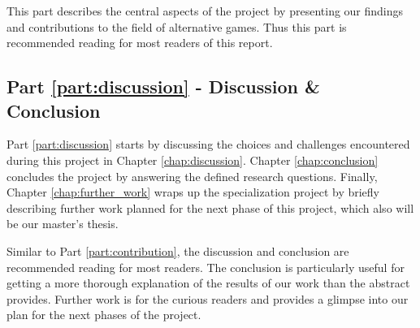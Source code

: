 \documentclass[../Main.tex]{subfiles}
\begin{document}
This part describes the central aspects of the project by presenting our findings and contributions to the field of alternative games. Thus this part is recommended reading for most readers of this report.

\subsection*{Part \ref{part:discussion} - Discussion \& Conclusion}
Part \ref{part:discussion} starts by discussing the choices and challenges encountered during this project in Chapter \ref{chap:discussion}. Chapter \ref{chap:conclusion} concludes the project by answering the defined research questions. Finally, Chapter \ref{chap:further_work} wraps up the specialization project by briefly describing further work planned for the next phase of this project, which also will be our master’s thesis.

Similar to Part \ref{part:contribution}, the discussion and conclusion are recommended reading for most readers. The conclusion is particularly useful for getting a more thorough explanation of the results of our work than the abstract provides. Further work is for the curious readers and provides a glimpse into our plan for the next phases of the project.



\biblio %
\end{document}
